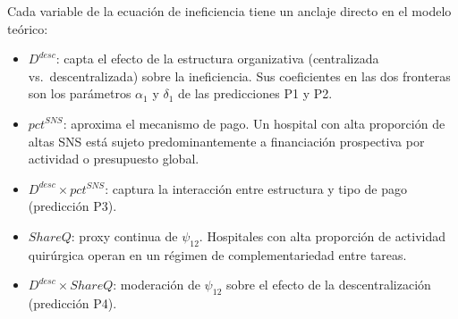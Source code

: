 \documentclass[12pt, a4paper, twoside, openright]{book}
\theoremstyle{plain}
\theoremstyle{definition}
\theoremstyle{remark}
\begin{document}
Cada variable de la ecuación de ineficiencia tiene un anclaje directo en el modelo teórico:
\begin{itemize}
  \item $D^{desc}$: capta el efecto de la estructura organizativa (centralizada vs.\ descentralizada) sobre la ineficiencia. Sus coeficientes en las dos fronteras son los parámetros $\alpha_1$ y $\delta_1$ de las predicciones P1 y P2.
  \item $pct^{SNS}$: aproxima el mecanismo de pago. Un hospital con alta proporción de altas SNS está sujeto predominantemente a financiación prospectiva por actividad o presupuesto global.
  \item $D^{desc}\times pct^{SNS}$: captura la interacción entre estructura y tipo de pago (predicción P3).
  \item $ShareQ$: proxy continua de $\psi_{12}$. Hospitales con alta proporción de actividad quirúrgica operan en un régimen de complementariedad entre tareas.
  \item $D^{desc}\times ShareQ$: moderación de $\psi_{12}$ sobre el efecto de la descentralización (predicción P4).
\end{itemize}
\end{document}
